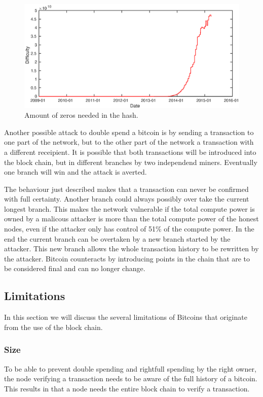 \begin{figure}
        \centerline{\includegraphics[scale=0.6]{relatedWork/figs/difficulty/difficulty.eps}}
	\caption{Amount of zeros needed in the hash.\cite{Blockchain.info-difficulty}}
	\label{fig:hash-difficulty}
\end{figure}

Another possible attack to double spend a bitcoin is by sending a transaction to one part of the network,
but to the other part of the network a transaction with a different receipient.
It is possible that both transactions will be introduced into the block chain, but in different branches by two independend miners.
Eventually one branch will win and the attack is averted.

The behaviour just described makes that a transaction can never be confirmed with full certainty.
Another branch could always possibly over take the current longest branch.
This makes the network vulnerable if the total compute power is owned by a malicous attacker is more than the total compute power of the honest nodes,
even if the attacker only has control of 51\% of the compute power.
In the end the current branch can be overtaken by a new branch started by the attacker.
This new branch allows the whole transaction history to be rewritten by the attacker.
Bitcoin counteracts by introducing points in the chain that are to be considered final and can no longer change.

\subsection{Limitations}
In this section we will discuss the several limitations of Bitcoins
that originate from the use of the block chain.

\subsubsection{Size}
\label{bitcoin-limit-size}
To be able to prevent double spending and rightfull spending by the right owner,
the node verifying a transaction needs to be aware of the full history of a bitcoin.
This results in that a node needs the entire block chain to verify a transaction.

